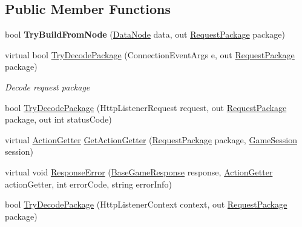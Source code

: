\subsection*{Public Member Functions}
\begin{DoxyCompactItemize}
\item 
\mbox{\label{class_t_net_1_1_contract_1_1_scut_action_dispatcher_ab5fbcdac148cbac1e569a7726e3114c6}} 
bool {\bfseries Try\+Build\+From\+Node} (\mbox{\hyperlink{class_t_net_1_1_data_node}{Data\+Node}} data, out \mbox{\hyperlink{class_t_net_1_1_contract_1_1_request_package}{Request\+Package}} package)
\item 
virtual bool \mbox{\hyperlink{class_t_net_1_1_contract_1_1_scut_action_dispatcher_a0e8423b7c8a7447b5b462b55d6b4fdfc}{Try\+Decode\+Package}} (Connection\+Event\+Args e, out \mbox{\hyperlink{class_t_net_1_1_contract_1_1_request_package}{Request\+Package}} package)
\begin{DoxyCompactList}\small\item\em Decode request package \end{DoxyCompactList}\item 
bool \mbox{\hyperlink{class_t_net_1_1_contract_1_1_scut_action_dispatcher_aad510a5ad8c140c45b6d992903fed081}{Try\+Decode\+Package}} (Http\+Listener\+Request request, out \mbox{\hyperlink{class_t_net_1_1_contract_1_1_request_package}{Request\+Package}} package, out int status\+Code)
\item 
virtual \mbox{\hyperlink{class_t_net_1_1_service_1_1_action_getter}{Action\+Getter}} \mbox{\hyperlink{class_t_net_1_1_contract_1_1_scut_action_dispatcher_adb33996b5f5bf5ad4ebf6ad59fa1f065}{Get\+Action\+Getter}} (\mbox{\hyperlink{class_t_net_1_1_contract_1_1_request_package}{Request\+Package}} package, \mbox{\hyperlink{class_t_net_1_1_contract_1_1_game_session}{Game\+Session}} session)
\item 
virtual void \mbox{\hyperlink{class_t_net_1_1_contract_1_1_scut_action_dispatcher_ad0983174f224f8b03e9fb0d3bc10579d}{Response\+Error}} (\mbox{\hyperlink{class_t_net_1_1_service_1_1_base_game_response}{Base\+Game\+Response}} response, \mbox{\hyperlink{class_t_net_1_1_service_1_1_action_getter}{Action\+Getter}} action\+Getter, int error\+Code, string error\+Info)
\item 
bool \mbox{\hyperlink{class_t_net_1_1_contract_1_1_scut_action_dispatcher_afdcd34dde1c7dcbe79569eea02676885}{Try\+Decode\+Package}} (Http\+Listener\+Context context, out \mbox{\hyperlink{class_t_net_1_1_contract_1_1_request_package}{Request\+Package}} package)

\end{DoxyCompactItemize}

